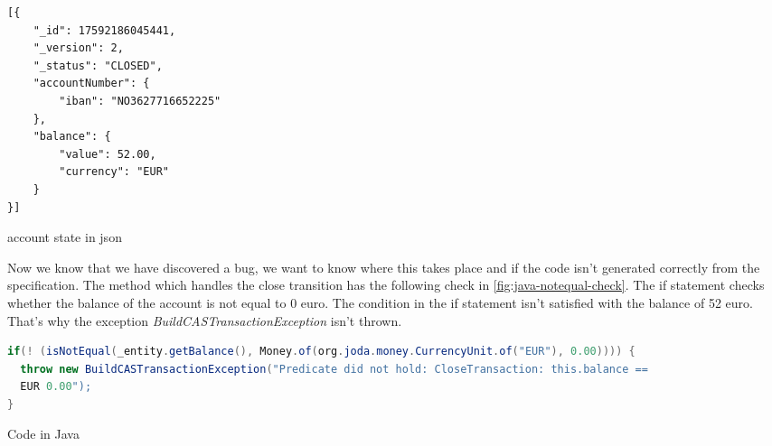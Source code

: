 \begin{sourcecode}[h!]
\begin{lstlisting}[]
[{
	"_id": 17592186045441,
	"_version": 2,
	"_status": "CLOSED",
	"accountNumber": {
		"iban": "NO3627716652225"
	},
	"balance": {
		"value": 52.00,
		"currency": "EUR"
	}
}]
\end{lstlisting}
\caption{account state in json}
\label{fig:closed-account-json}
\end{sourcecode}









Now we know that we have discovered a bug, we want to know where this takes
place and if the code isn't generated correctly from the specification. The
method which handles the close transition has the following check in
\autoref{fig:java-notequal-check}. The if statement checks whether the balance
of the account is not equal to 0 euro. The condition in the if statement isn't
satisfied with the balance of 52 euro. That's why the exception
\textit{BuildCASTransactionException} isn't thrown.

\begin{sourcecode}[h!]
\begin{lstlisting}[language=Java]
if(! (isNotEqual(_entity.getBalance(), Money.of(org.joda.money.CurrencyUnit.of("EUR"), 0.00)))) {
  throw new BuildCASTransactionException("Predicate did not hold: CloseTransaction: this.balance ==
  EUR 0.00");
}
\end{lstlisting}
\caption{Code in Java}
\label{fig:java-notequal-check}
\end{sourcecode}

